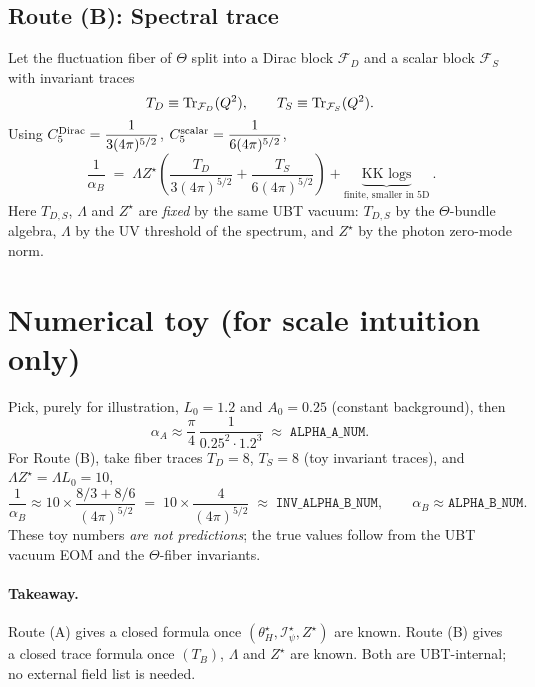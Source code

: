 \documentclass[12pt]{article}
\begin{document}
\subsection*{Route (B): Spectral trace}
Let the fluctuation fiber of $\Theta$ split into a Dirac block $\mathcal F_D$ and a scalar block $\mathcal F_S$ with invariant traces
\begin{equation}
T_D\equiv \Tr_{\mathcal F_D}(Q^2),\qquad T_S\equiv \Tr_{\mathcal F_S}(Q^2).
\end{equation}
Using $C_5^{\rm Dirac}=\dfrac{1}{3(4\pi)^{5/2}}$, $C_5^{\rm scalar}=\dfrac{1}{6(4\pi)^{5/2}}$,
\begin{equation}
\boxed{~ \frac{1}{\alpha_B} \;=\; \Lambda Z^\star \left( \frac{T_D}{3(4\pi)^{5/2}} + \frac{T_S}{6(4\pi)^{5/2}} \right) + \underbrace{\text{KK logs}}_{\text{finite, smaller in 5D}} ~}.
\end{equation}
Here $T_{D,S}$, $\Lambda$ and $Z^\star$ are \emph{fixed} by the same UBT vacuum: $T_{D,S}$ by the $\Theta$-bundle algebra,
$\Lambda$ by the UV threshold of the spectrum, and $Z^\star$ by the photon zero-mode norm.

\section*{Numerical toy (for scale intuition only)}
Pick, purely for illustration, $L_0=1.2$ and $A_0=0.25$ (constant background), then
\begin{equation}
\alpha_A \approx \frac{\pi}{4}\,\frac{1}{0.25^2 \cdot 1.2^3} \;\approx\; \texttt{ALPHA\_A\_NUM}.
\end{equation}
For Route (B), take fiber traces $T_D=8$, $T_S=8$ (toy invariant traces), and $\Lambda Z^\star = \Lambda L_0 = 10$,
\begin{equation}
\frac{1}{\alpha_B} \approx 10 \times \frac{8/3 + 8/6}{(4\pi)^{5/2}} \;=\; 10 \times \frac{4}{(4\pi)^{5/2}} \;\approx\; \texttt{INV\_ALPHA\_B\_NUM},
\qquad \alpha_B \approx \texttt{ALPHA\_B\_NUM}.
\end{equation}
These toy numbers \emph{are not predictions}; the true values follow from the UBT vacuum EOM and the $\Theta$-fiber invariants.

\paragraph{Takeaway.} Route (A) gives a closed formula once $(\theta_H^\star,\mathcal I_\psi^\star,Z^\star)$ are known. Route (B) gives a closed
trace formula once $(T_B)$, $\Lambda$ and $Z^\star$ are known. Both are UBT-internal; no external field list is needed.
\end{document}
